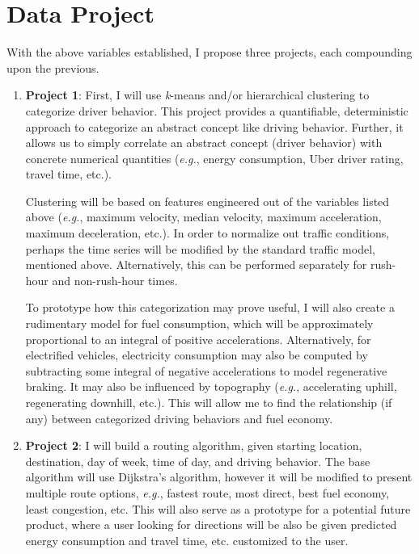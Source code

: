 \documentclass[12pt]{article}
\begin{document}
\section{Data Project}

With the above variables established, I propose three projects, each compounding upon the previous.

\begin{enumerate}

\item \textbf{Project 1}: First, I will use \textit{k}-means and/or hierarchical clustering to categorize driver behavior. This project provides a quantifiable, deterministic approach to categorize an abstract concept like driving behavior. Further, it allows us to simply correlate an abstract concept (driver behavior) with concrete numerical quantities (\textit{e.g.}, energy consumption, Uber driver rating, travel time, etc.).

Clustering will be based on features engineered out of the variables listed above (\textit{e.g.}, maximum velocity, median velocity, maximum acceleration, maximum deceleration, etc.). In order to normalize out traffic conditions, perhaps the time series will be modified by the standard traffic model, mentioned above. Alternatively, this can be performed separately for rush-hour and non-rush-hour times.

To prototype how this categorization may prove useful, I will also create a rudimentary model for fuel consumption, which will be approximately proportional to an integral of positive accelerations. Alternatively, for electrified vehicles, electricity consumption may also be computed by subtracting some integral of negative accelerations to model regenerative braking. It may also be influenced by topography (\textit{e.g.}, accelerating uphill, regenerating downhill, etc.). This will allow me to find the relationship (if any) between categorized driving behaviors and fuel economy.

\item \textbf{Project 2}: I will build a routing algorithm, given starting location, destination, day of week, time of day, and driving behavior. The base algorithm will use Dijkstra's algorithm, however it will be modified to present multiple route options, \textit{e.g.}, fastest route, most direct, best fuel economy, least congestion, etc. This will also serve as a prototype for a potential future product, where a user looking for directions will be also be given predicted energy consumption and travel time, etc. customized to the user.


\end{enumerate}
\end{document}
